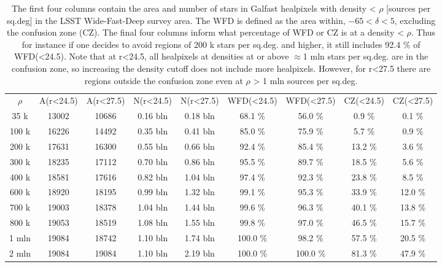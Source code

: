 \documentclass[DM,lsstdraft,toc,usenatbib,authoryear]{lsstdoc}
\begin{document}
\begin{centering}
\begin{table}
\caption{The first four columns contain the area and number of stars  in Galfast healpixels with density < $\rho$ [sources per sq.deg] in the LSST Wide-Fast-Deep survey area. The WFD is defined as the area within, $-65 < \delta < 5$, excluding the confusion zone (CZ). The final four columns inform what percentage of WFD or CZ is at a density  < $\rho$. Thus for instance if one decides to avoid regions of 200 k stars per sq.deg. and higher, it still includes  92.4 \% of WFD(<24.5).
Note that at r<24.5, all healpixels at densities at or above $\approx$1 mln stars per sq.deg. are in  the confusion zone, so increasing the density cutoff does not include more healpixels. However, for r<27.5 there are regions outside the confusion zone even at $\rho$ > 1 mln sources per sq.deg. }
\label{tab:galfast_densities}
\begin{tabular}{ccccccccc}
$\rho$ & A(r<24.5) & A(r<27.5) & N(r<24.5) & N(r<27.5) & WFD(<24.5) & WFD(<27.5) & CZ(<24.5) & CZ(<27.5) \\
35 k & 13002 & 10686 & 0.16 bln & 0.18 bln & 68.1 \% & 56.0 \% & 0.9 \% & 0.1 \% \\
100 k & 16226 & 14492 & 0.35 bln & 0.41 bln & 85.0 \% & 75.9 \% & 5.7 \% & 0.9 \% \\
200 k & 17631 & 16300 & 0.55 bln & 0.66 bln & 92.4 \% & 85.4 \% & 13.2 \% & 3.6 \% \\
300 k & 18235 & 17112 & 0.70 bln & 0.86 bln & 95.5 \% & 89.7 \% & 18.5 \% & 5.6 \% \\
400 k & 18581 & 17616 & 0.82 bln & 1.04 bln & 97.4 \% & 92.3 \% & 23.8 \% & 8.5 \% \\
600 k & 18920 & 18195 & 0.99 bln & 1.32 bln & 99.1 \% & 95.3 \% & 33.9 \% & 12.0 \% \\
700 k & 19003 & 18378 & 1.04 bln & 1.44 bln & 99.6 \% & 96.3 \% & 40.1 \% & 13.8 \% \\
800 k & 19053 & 18519 & 1.08 bln & 1.55 bln & 99.8 \% & 97.0 \% & 46.5 \% & 15.7 \% \\
1 mln & 19084 & 18742 & 1.10 bln & 1.74 bln & 100.0 \% & 98.2 \% & 57.5 \% & 20.5 \% \\
2 mln & 19084 & 19084 & 1.10 bln & 2.19 bln & 100.0 \% & 100.0 \% & 81.3 \% & 47.9 \% \\
\end{tabular}
\end{table}
\end{centering}
\end{document}
